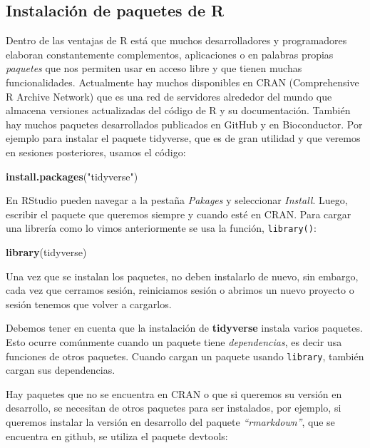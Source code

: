 \documentclass[
]{book}
\newenvironment{Shaded}{\begin{snugshade}}{\end{snugshade}}
\newcommand{\FunctionTok}[1]{\textcolor[rgb]{0.13,0.29,0.53}{\textbf{#1}}}
\newcommand{\NormalTok}[1]{#1}
\newcommand{\StringTok}[1]{\textcolor[rgb]{0.31,0.60,0.02}{#1}}
\begin{document}
\hfill\break

\subsection{Instalación de paquetes de R}\label{instalaciuxf3n-de-paquetes-de-r}

Dentro de las ventajas de R está que muchos desarrolladores y programadores elaboran constantemente complementos, aplicaciones o en palabras propias \emph{paquetes} que nos permiten usar en acceso libre y que tienen muchas funcionalidades.
Actualmente hay muchos disponibles en CRAN (Comprehensive R Archive Network) que es una red de servidores alrededor del mundo que almacena versiones actualizadas del código de R y su documentación.
También hay muchos paquetes desarrollados publicados en GitHub y en Bioconductor.
Por ejemplo para instalar el paquete tidyverse, que es de gran utilidad y que veremos en sesiones posteriores, usamos el código:

\begin{Shaded}
\begin{Highlighting}[]
\FunctionTok{install.packages}\NormalTok{(}\StringTok{"tidyverse"}\NormalTok{)}
\end{Highlighting}
\end{Shaded}

En RStudio pueden navegar a la pestaña \emph{Pakages} y seleccionar \emph{Install}.
Luego, escribir el paquete que queremos siempre y cuando esté en CRAN.
Para cargar una librería como lo vimos anteriormente se usa la función, \texttt{library()}:

\begin{Shaded}
\begin{Highlighting}[]
\FunctionTok{library}\NormalTok{(tidyverse)}
\end{Highlighting}
\end{Shaded}

Una vez que se instalan los paquetes, no deben instalarlo de nuevo, sin embargo, cada vez que cerramos sesión, reiniciamos sesión o abrimos un nuevo proyecto o sesión tenemos que volver a cargarlos.

Debemos tener en cuenta que la instalación de \textbf{tidyverse} instala varios paquetes.
Esto ocurre comúnmente cuando un paquete tiene \emph{dependencias}, es decir usa funciones de otros paquetes.
Cuando cargan un paquete usando \texttt{library}, también cargan sus dependencias.

Hay paquetes que no se encuentra en CRAN o que si queremos su versión en desarrollo, se necesitan de otros paquetes para ser instalados, por ejemplo, si queremos instalar la versión en desarrollo del paquete \emph{``rmarkdown''}, que se encuentra en github, se utiliza el paquete devtools:
\end{document}
